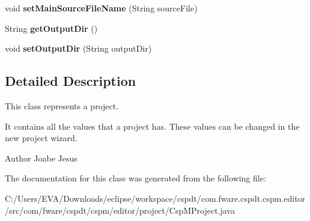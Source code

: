 \begin{DoxyCompactItemize}
void {\bfseries set\+Main\+Source\+File\+Name} (String source\+File)
\item 
\mbox{\label{classcom_1_1fware_1_1cspdt_1_1cspm_1_1editor_1_1project_1_1_csp_m_project_a20016dc081d8ba33e4c709118f42290f}} 
String {\bfseries get\+Output\+Dir} ()
\item 
\mbox{\label{classcom_1_1fware_1_1cspdt_1_1cspm_1_1editor_1_1project_1_1_csp_m_project_a2663911be9648bbc28a3930666182cff}} 
void {\bfseries set\+Output\+Dir} (String output\+Dir)
\end{DoxyCompactItemize}


\subsection{Detailed Description}
This class represents a project. 

It contains all the values that a project has. These values can be changed in the new project wizard.

\begin{DoxyAuthor}{Author}
Joabe Jesus 
\end{DoxyAuthor}


The documentation for this class was generated from the following file\+:\begin{DoxyCompactItemize}
\item 
C\+:/\+Users/\+E\+V\+A/\+Downloads/eclipse/workspace/cspdt/com.\+fware.\+cspdt.\+cspm.\+editor/src/com/fware/cspdt/cspm/editor/project/Csp\+M\+Project.\+java\end{DoxyCompactItemize}
